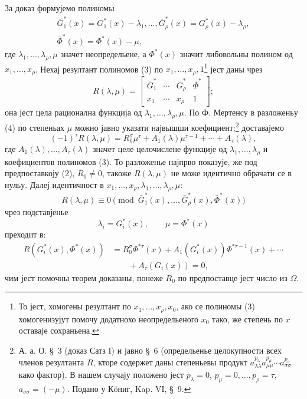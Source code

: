 ﻿\documentclass[11pt]{article}
\begin{document}
За доказ формујемо полиномы
\begin{equation}
\begin{gathered}
  \bar G_1^*(x)=G_1^*(x)-\lambda_1,
  \ldots,
  \bar G_\rho^*(x)=G_\rho^*(x)-\lambda_\rho,\\
  \bar\Phi^*(x)=\Phi^*(x)-\mu,
\end{gathered}
\tag{3}
\end{equation}
где $\lambda_1,\ldots,\lambda_\rho,\mu$ значет неопредельене, а $\Phi^*(x)$ значит либовольны полином од $x_1,\ldots,x_\rho$. Нехај резултант полиномов (3) по $x_1,\ldots,x_\rho,1$\footnote{То јест, хомогены резултант по $x_1,\ldots,x_\rho,x_0$, ако се полиномы (3) хомогенизујут помочу додатнохо неопредельеного $x_0$ тако, же степень по $x$ оставаје сохраньена.} јест даны чрез
\begin{equation}
  R(\lambda,\mu)=\left[
  \begin{array}{cccc}
   \bar G_1^*&\cdots&\bar G_\rho^*&\bar\Phi^*\\
   x_1&\cdots&x_\rho&1
  \end{array}
  \right];
\tag{4}
\end{equation}
она јест цела рационална функција од $\lambda_1,\ldots,\lambda_\rho,\mu$. По Ф. Мертенсу в разложеньу (4) по степеньах $\mu$ можно јавно указати највышши коефициент;\footnote{А. а. О. \S\ 3 (доказ Сатз I) и јавно \S\ 6 (определьенье целокупности всех членов резултанта $R$, кторе содержет даны степеньевы продукт $a_{\lambda\lambda}^{p_\lambda} a_{\mu\mu}^{p_\mu}\cdots a_{\sigma\sigma}^{p_\sigma}$ како фактор). В нашем случају положено јест $p_\lambda=0$, $p_\mu=0,\ldots,p_\rho=\tau$, $a_{\sigma\sigma}=(-\mu)$. Подано у Кöниг, Kap. VI, \S\ 9.} доставајемо
\begin{equation}
  (-1)^\tau R(\lambda,\mu)
  =R_0^\sigma\mu^\tau+A_1(\lambda)\mu^{\tau-1}+\cdots+A_\tau(\lambda),
\tag{5}
\end{equation}
где $A_1(\lambda),\ldots,A_\tau(\lambda)$ значет целе целочислене функције од $\lambda_1,\ldots,\lambda_\rho$ и коефициентов полиномов (3). То разложенье најпрво показује, же под предпоставкоју (2), $R_0\ne0$, такоже $R(\lambda,\mu)$ не може идентично обрачати се в нульу. Далеј идентичност в $x_1,\ldots,x_\rho,\lambda_1,\ldots,\lambda_\rho,\mu$:
\[
  R(\lambda,\mu)\equiv 0\pmod{\bar G_1^*(x),\ldots,
  \bar G_\rho^*(x),\bar\Phi^*(x)}
\]
чрез подставјенье
\[
  \lambda_i=G_i^*(x),\qquad \mu=\Phi^*(x)
\]
преходит в:
\begin{equation}
\begin{aligned}
  R(G_i^*(x),\Phi^*(x))
  &=R_0^\sigma\Phi^{*\tau}(x)
    +A_1(G_i^*(x))\Phi^{*\tau-1}(x)+\cdots \\
  &\qquad +A_\tau(G_i(x))=0,
\end{aligned}
\tag{6}
\end{equation}
чим јест помочны теорем доказаны, понеже $R_0$ по предпоставце јест число из $\Omega$.
\end{document}
